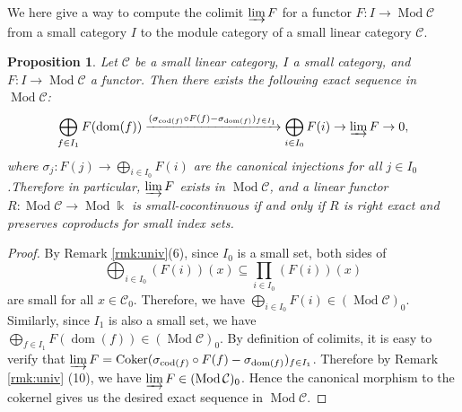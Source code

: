 \documentclass{surv-l}
\numberwithin{equation}{chapter}
\numberwithin{figure}{chapter}
\theoremstyle{plain}
\newtheorem{prp}[thm]{Proposition}
\theoremstyle{definition}
\theoremstyle{remark}
\DeclareMathOperator{\Cok}{Coker}
\DeclareMathOperator{\Mod}{Mod}
\DeclareMathOperator{\dom}{dom}
\DeclareMathOperator{\cod}{cod}
\begin{document}
We here give a way to compute the colimit $\varinjlim F$ for
a functor $F\colon I \to \Mod {\mathcal{C}}$ from a small category $I$ to the module category
of a small linear category ${\mathcal{C}}$.

\begin{prp}\label{prp:colim-small}
Let ${\mathcal{C}}$ be a small linear category, $I$ a small category, and
$F \colon I \to \Mod{\mathcal{C}}$ a functor.
Then there exists the following exact sequence in $\Mod{\mathcal{C}}$:
\[
\bigoplus_{f \in I_1} F(\dom(f)) \xrightarrow{(\sigma_{\cod(f)}\circ F(f) - \sigma_{\dom(f)})_{f \in I_1}} \bigoplus_{i\in I_0} F(i) \to
\varinjlim F \to 0,
\]
where $\sigma_j \colon F(j) \to \bigoplus_{i\in I_0} F(i)$ are the canonical injections for all $j \in I_0$.Therefore in particular, $\varinjlim F$ exists in $\Mod{\mathcal{C}}$, and
a linear functor
$R \colon \Mod {\mathcal{C}} \to \Mod\Bbbk$
is small-cocontinuous if and only if
$R$ is right exact and preserves coproducts for
small index sets.
\end{prp}

\begin{proof}
By Remark \ref{rmk:univ}(6), since
$I_0$ is a small set, both sides of
\[
\bigoplus_{i \in I_0} (F(i))(x) \subseteq \prod_{i \in I_0} (F(i))(x)
\]
are small for all $x \in {\mathcal{C}}_0$.
Therefore, we have $\bigoplus_{i \in I_0} F(i) \in (\Mod{\mathcal{C}})_0$.
Similarly, since $I_1$ is also a small set,
we have $\bigoplus_{f \in I_1} F(\dom(f)) \in (\Mod{\mathcal{C}})_0$.
By definition of colimits,
it is easy to verify that
$\varinjlim F = \Cok (\sigma_{\cod(f)}\circ F(f) - \sigma_{\dom(f)})_{f \in I_1}$.
Therefore by Remark \ref{rmk:univ} (10),
we have $\varinjlim F \in (\Mod{\mathcal{C}})_0$.
Hence the canonical morphism to the cokernel gives us the desired
exact sequence in $\Mod{\mathcal{C}}$.
\end{proof}
\end{document}
